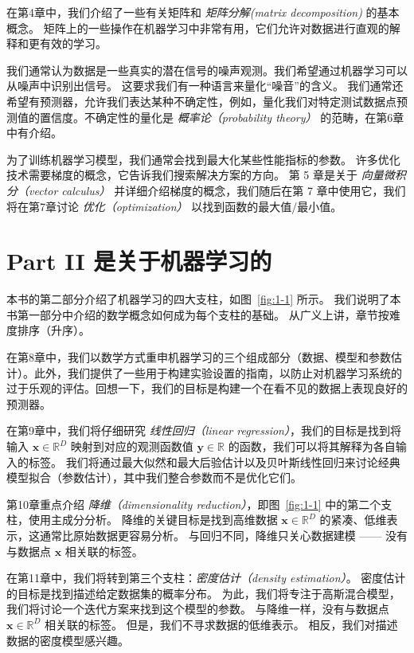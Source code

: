 在第4章中，我们介绍了一些有关矩阵和 \emph{矩阵分解(matrix decomposition)} 的基本概念。 矩阵上的一些操作在机器学习中非常有用，它们允许对数据进行直观的解释和更有效的学习。

我们通常认为数据是一些真实的潜在信号的噪声观测。我们希望通过机器学习可以从噪声中识别出信号。 这要求我们有一种语言来量化“噪音”的含义。 我们通常还希望有预测器，允许我们表达某种不确定性，例如，量化我们对特定测试数据点预测值的置信度。不确定性的量化是 \emph{概率论（probability theory）} 的范畴，在第6章中有介绍。

为了训练机器学习模型，我们通常会找到最大化某些性能指标的参数。 许多优化技术需要梯度的概念，它告诉我们搜索解决方案的方向。 第 5 章是关于 \emph{向量微积分（vector calculus）} 并详细介绍梯度的概念，我们随后在第 7 章中使用它，我们将在第7章讨论 \emph{优化（optimization）} 以找到函数的最大值/最小值。

\section*{Part II 是关于机器学习的}

本书的第二部分介绍了机器学习的四大支柱，如图~\ref{fig:1-1} 所示。 我们说明了本书第一部分中介绍的数学概念如何成为每个支柱的基础。 从广义上讲，章节按难度排序（升序）。

在第8章中，我们以数学方式重申机器学习的三个组成部分（数据、模型和参数估计）。此外，我们提供了一些用于构建实验设置的指南，以防止对机器学习系统的过于乐观的评估。回想一下，我们的目标是构建一个在看不见的数据上表现良好的预测器。

在第9章中，我们将仔细研究 \emph{线性回归（linear regression）}，我们的目标是找到将输入 $ \boldsymbol{x} \in \mathbb{R}^D $ 映射到对应的观测函数值 $ \boldsymbol{y} \in \mathbb{R} $ 的函数，我们可以将其解释为各自输入的标签。 我们将通过最大似然和最大后验估计以及贝叶斯线性回归来讨论经典模型拟合（参数估计），其中我们整合参数而不是优化它们。

第10章重点介绍 \emph{降维（dimensionality reduction）}，即图~\ref{fig:1-1} 中的第二个支柱，使用主成分分析。 降维的关键目标是找到高维数据 $ \boldsymbol{x} \in \mathbb{R}^D $ 的紧凑、低维表示，这通常比原始数据更容易分析。 与回归不同，降维只关心数据建模 —— 没有与数据点 $ \boldsymbol{x} $ 相关联的标签。

在第11章中，我们将转到第三个支柱：\emph{密度估计（density estimation）}。 密度估计的目标是找到描述给定数据集的概率分布。 为此，我们将专注于高斯混合模型，我们将讨论一个迭代方案来找到这个模型的参数。 与降维一样，没有与数据点 $ \boldsymbol{x} \in \mathbb{R}^D $ 相关联的标签。 但是，我们不寻求数据的低维表示。 相反，我们对描述数据的密度模型感兴趣。

